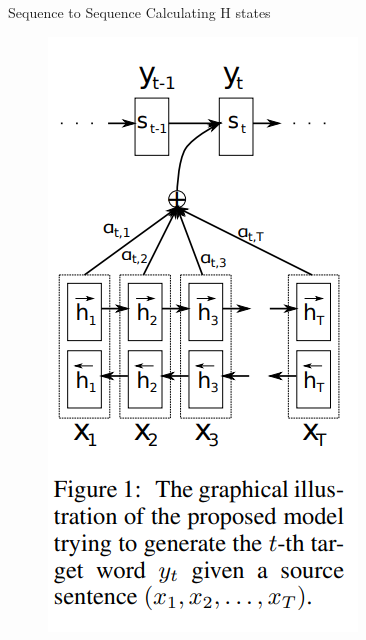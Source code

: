 \begin{frame}[allowframebreaks]{Sequence to Sequence Calculating H states}
    \begin{figure}
        \centering
        \includegraphics[height=0.9\textheight,keepaspectratio]{images/rnn/slide_14_1_img.png}
    \end{figure}
\end{frame}


